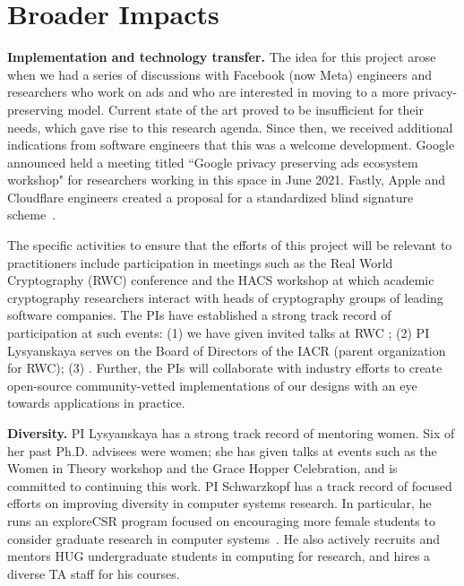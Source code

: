 \section{Broader Impacts}
\noindent\textbf{Implementation and technology transfer.}  
The idea for this project arose when we had a series of discussions with Facebook (now Meta) engineers and researchers who work on ads and who are interested in moving to a more privacy-preserving model.  Current state of the art proved to be insufficient for their needs, which gave rise to this research agenda.
%
Since then, we received additional indications from software engineers that this was a welcome development.  Google announced held a meeting titled ``Google privacy preserving ads ecosystem workshop" for researchers working in this space in June 2021.  Fastly, Apple and Cloudflare engineers created a proposal for a standardized blind signature scheme~\cite{ietf:djw21,ietf:djw22}.  


The specific activities to ensure that the efforts of this project will be relevant to practitioners include participation in meetings such as the Real World Cryptography (RWC) conference and the HACS workshop at which academic cryptography researchers interact with heads of cryptography groups of leading software companies.  The PIs have established a strong track record of participation at such events: (1) we have given invited talks at RWC ; (2) PI Lysyanskaya serves on the Board of Directors of the IACR (parent organization for RWC); (3) .
Further, the PIs will collaborate with industry efforts to create open-source community-vetted implementations of our designs with an eye towards applications in practice.  

\noindent\textbf{Diversity.} PI Lysyanskaya has a strong track record of mentoring women. Six of her past Ph.D. advisees were women; she has given talks at events such as the Women in Theory workshop and the Grace Hopper Celebration, and is committed to continuing this work.
PI Schwarzkopf has a track record of focused efforts on improving diversity in computer systems research. In particular, he runs an exploreCSR program focused on encouraging more female students to consider graduate research in computer systems~\cite{explorecsr-systems}. He also actively recruits and mentors HUG undergraduate students in computing for research, and hires a diverse TA staff for his courses.

